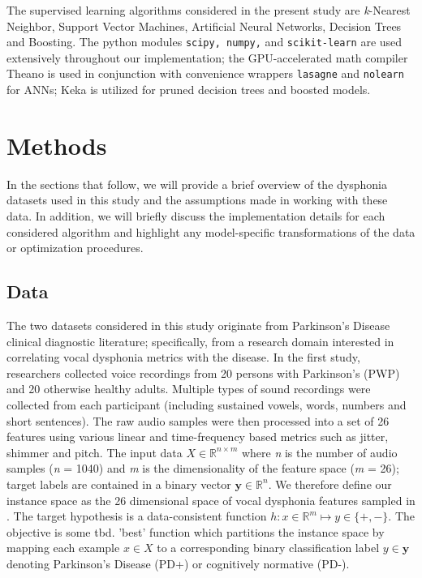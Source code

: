 \documentclass[12pt]{article}
\begin{document}
The supervised learning algorithms considered in the present study are \textit{k}-Nearest Neighbor, Support Vector Machines, Artificial Neural Networks, Decision Trees and Boosting. The python modules \texttt{scipy, numpy,} and \texttt{scikit-learn} \cite{scipy} \cite{scikit-learn} are used extensively  throughout our implementation; the GPU-accelerated math compiler Theano \cite{bergstra+al:2010-scipy} is used in conjunction with convenience wrappers \texttt{lasagne} and \texttt{nolearn} for ANNs; Keka \cite{Hall2009} is utilized for pruned decision trees and boosted models.\cite{Tsanas2010}

\section{Methods}
\label{sec:meth}
In the sections that follow, we will provide a brief overview of the dysphonia datasets used in this study and the assumptions made in working with these data. In addition, we will briefly discuss the implementation details for each considered algorithm and highlight any model-specific transformations of the data or optimization procedures.

\subsection{Data}
The two datasets considered in this study originate from Parkinson's Disease clinical diagnostic literature; specifically, from a research domain interested in correlating vocal dysphonia metrics with the disease. In the first study, researchers collected voice recordings from 20 persons with Parkinson's (PWP) and 20 otherwise healthy adults. Multiple types of sound recordings were collected from each participant (including sustained vowels, words, numbers and short sentences). The raw audio samples were then processed into a set of 26 features using various linear and time-frequency based metrics such as jitter, shimmer and pitch. The input data $X \in \mathbb{R}^{n \times m} $ where \textit{n} is the number of audio samples (\textit{n} = 1040) and \textit{m} is the dimensionality of the feature space (\textit{m} = 26); target labels are contained in a binary vector $ \boldsymbol{y} \in \mathbb{R}^n $. We therefore define our instance space as the 26 dimensional space of vocal dysphonia features sampled in \cite{Sakar2013}. The target hypothesis is a data-consistent function $ h : x \in \mathbb{R}^m \mapsto y \in \lbrace +,- \rbrace $. The objective is some tbd. 'best' function which partitions the instance space by mapping each example $ x \in X $ to a corresponding binary classification label $ y \in \boldsymbol{y} $ denoting Parkinson's Disease (PD+) or cognitively normative (PD-).
\end{document}
